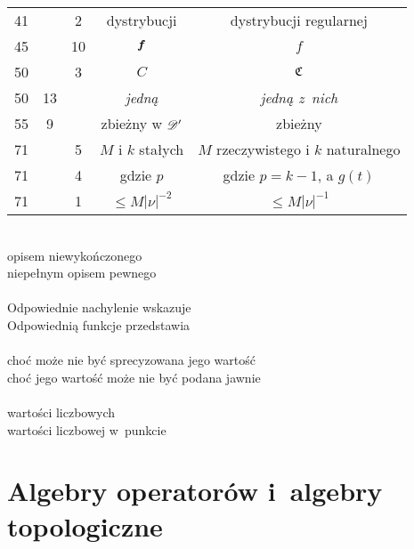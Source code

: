 \documentclass[a4paper,11pt]{article}
\begin{document}
\begin{center}
\begin{tabular}{|c|c|c|c|c|}
    41 & & 2 & dystrybucji & dystrybucji regularnej \\
    45 & & 10 & $\boldsymbol{f}$ & $f$ \\
    50 & & 3 & $C$ & $\mathfrak{C}$ \\
    50 & 13 & & \emph{jedną} & \emph{jedną z~nich} \\
    55 & 9 & & zbieżny w $\mathcal{D}'$ & zbieżny \\
    71 & & 5 & $M$ i $k$ stałych & $M$ rzeczywistego i $k$ naturalnego \\
    71 & & 4 & gdzie $p$ & gdzie $p = k - 1$, a $g( t )$\\
    71 & & 1 & $\leq M | \nu |^{ -2 }$ & $\leq M | \nu |^{ -1 }$\\
    \hline
  \end{tabular}
\end{center}
\noi
{} \\
\Jest opisem niewykończonego \\
\Powin niepełnym opisem pewnego \\
 \\
\Jest Odpowiednie nachylenie wskazuje \\
\Powin Odpowiednią funkcje przedstawia \\
 \\
\Jest choć może nie być sprecyzowana jego wartość \\
\Powin choć jego wartość może nie być podana jawnie \\
 \\
\Jest wartości liczbowych \\
\Powin wartości liczbowej w~punkcie \\

\vspace{\spaceTwo}





\section{Algebry operatorów i~algebry topologiczne}

\vspace{\spaceTwo}


\end{document}
